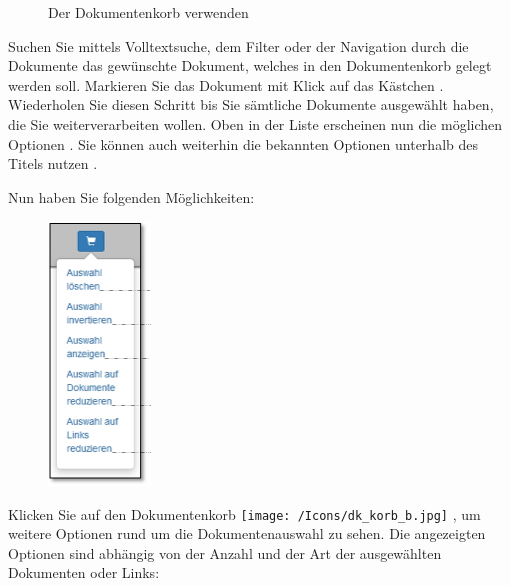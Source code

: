 \begin{figure}[H]
\vspace{-15pt}
\caption{Der Dokumentenkorb verwenden}
\end{figure}

Suchen Sie mittels Volltextsuche, dem Filter oder der Navigation durch die Dokumente das gewünschte Dokument, welches in den Dokumentenkorb gelegt werden soll. Markieren Sie das Dokument mit Klick auf das Kästchen . Wiederholen Sie diesen Schritt bis Sie sämtliche Dokumente ausgewählt haben, die Sie weiterverarbeiten wollen. Oben in der Liste erscheinen nun die möglichen Optionen . Sie können auch weiterhin die bekannten Optionen unterhalb des Titels nutzen .

\vspace{\baselineskip}

Nun haben Sie folgenden Möglichkeiten:\\


\begin{figure}
\vspace{-15pt}
\includegraphics[height=70mm]{../chapters/11_Dokumentenablage/pictures/11-dkorb_Auswahl.jpg}
\end{figure}
Klicken Sie auf den Dokumentenkorb \texttt{[image: /Icons/dk\_korb\_b.jpg]} , um weitere Optionen rund um die Dokumentenauswahl zu sehen. Die angezeigten Optionen sind abhängig von der Anzahl und der Art der ausgewählten Dokumenten oder Links:

